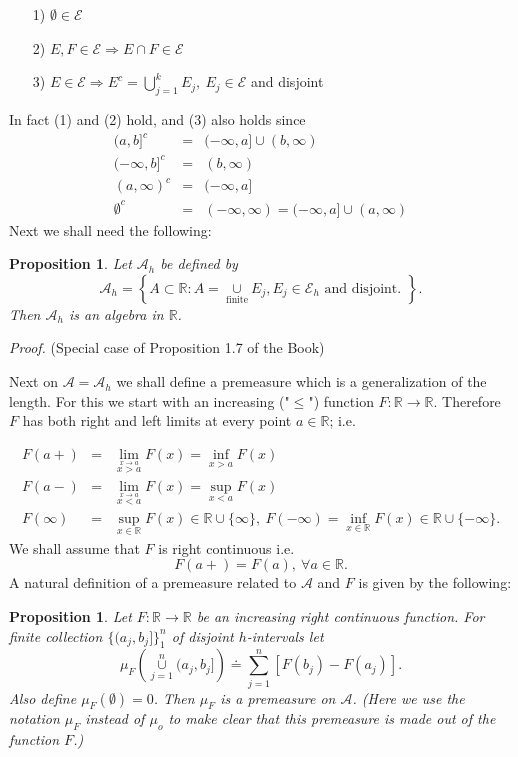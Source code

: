 \documentclass[12pt]{report}
\newtheorem{prop}[theorem]{Proposition}
\begin{document}
\begin{itemize}
\item[1)]  $\emptyset \in \mathcal{E}$
\item[2)]  $E, F \in \mathcal{E} \Longrightarrow E \cap F \in \mathcal{E}$
\item[3)]  $E \in \mathcal{E} \Longrightarrow E^c = \bigcup\limits^k_{j=1}
E_j, \ E_j \in\mathcal{E}$ and disjoint
\end{itemize}

In fact (1) and (2) hold, and (3) also holds since
\begin{eqnarray*} (a, b]^c &=& (- \infty, a] \cup (b, \infty)\\ (- \infty, b]^c
&=& (b, \infty)\\ (a, \infty)^c &=& (- \infty, a]\\
\emptyset^c &=& (-\infty, \infty) = (- \infty, a] \cup (a, \infty)
\end{eqnarray*}
 Next we shall need the following:

\medskip
\noindent
\begin{prop} Let $\mathcal{A}_h$ be defined by
\[
\mathcal{A}_h = \left \{A \subset \mathbb{R}: A =
\underset{\mbox{finite}}{\cup} E_j, E_j \in
\mathcal{E}_h \mbox{ and disjoint. }\right \}.
\]
Then $\mathcal{A}_h$ is an algebra in $\mathbb{R}$.
\end{prop}
 {\em Proof.}  (Special case of Proposition 1.7 of the Book)

\medskip
\noindent 
Next on $\mathcal{A}=\mathcal{A}_h$ we shall define a
premeasure which is a generalization of the length.  For this we start with
an increasing  ("$\le$") function $F:
\mathbb{R} \to\mathbb{R}$.  Therefore $F$ has both right and left limits at
every point $a\in \mathbb{R}$; i.e.

\begin{eqnarray*} F(a+) &=& \lim_{\stackrel{x \to a}{x > a}} F(x) 
= \inf_{x> a} F(x)\\ F(a-) &=& \lim_{\stackrel{x \to a}{x < a}} F(x) =
\sup_{x < a} F(x)
\\ F(\infty) &=& \sup_{x \in \mathbb{R}} F(x) \in \mathbb{R} \cup
\{\infty\}, \ F (-\infty) =
\inf_{x \in \mathbb{R}} F(x) \in \mathbb{R} \cup \{- \infty\}.
\end{eqnarray*} We shall assume that $F$ is right continuous i.e.
\[F(a+) = F(a), \ \forall a \in \mathbb{R}.
\] A natural definition of a premeasure related to $\mathcal{A}$ and $F$ is
given by the following:


\begin{prop} Let $F: \mathbb{R} \longrightarrow
\mathbb{R}$
  be an increasing right continuous function.   For finite collection
$\{(a_j, b_j]\}_1^n$ of disjoint $h$-intervals let
\[
\mu_F \left ( \overset{n}{\underset{j=1}{\cup}}  (a_j, b_j] \right ) \doteq
\sum^n_{j=1} [F(b_j) - F(a_j)].
\]
Also define $\mu_F(\emptyset) = 0$.  Then $\mu_F$ is a premeasure
on $\mathcal{A}$. (Here we use the notation $\mu_F$ instead of 
$\mu_o$ to make clear that this premeasure is made out of the
function $F$.) 
\end{prop}
\end{document}
